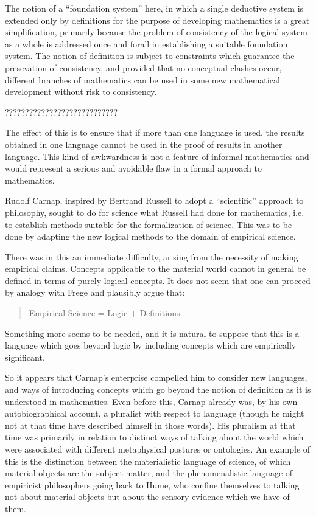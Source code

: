 The notion of a ``foundation system'' here, in which a single
deductive system is extended only by definitions for the purpose
of developing mathematics is a great simplification, primarily
because the problem of consistency of the logical system as a whole
is addressed once and forall in establishing a suitable foundation
system.
The notion of definition is subject to constraints which guarantee
the presevation of consistency, and provided that no conceptual
clashes occur, different branches of mathematics can be used in
some new mathematical development without risk to consistency.

????????????????????????????

The effect of this is to ensure that if more than one language is
used, the results obtained in one language cannot be used in the proof
of results in another language.
This kind of awkwardness is not a feature of informal mathematics and
would represent a serious and avoidable flaw in a formal approach to
mathematics.

Rudolf Carnap, inspired by Bertrand Russell to adopt a ``scientific''
approach to philosophy, sought to do for science what Russell had
done for mathematics, i.e. to establish methods suitable for the
formalization of science.
This was to be done by adapting the new logical methods to the domain
of empirical science.

There was in this an immediate difficulty, arising from the necessity
of making empirical claims.
Concepts applicable to the material world cannot in general be defined
in terms of purely logical concepts.
It does not seem that one can proceed by analogy with Frege and
plausibly argue that:

\begin{quote}
Empirical Science = Logic + Definitions
\end{quote}

Something more seems to be needed, and it is natural to suppose that
this is a language which goes beyond logic by including concepts which
are empirically significant.

So it appears that Carnap's enterprise compelled him to consider
new languages, and ways of introducing concepts which go beyond
the notion of definition as it is understood in mathematics.
Even before this, Carnap already was, by his own autobiographical
account, a pluralist with respect to language (though he might not at
that time have described himself in those words).
His pluralism at that time was primarily in relation to distinct ways
of talking about the world which were associated with different
metaphysical postures or ontologies.
An example of this is the distinction between the materialistic language of science,
of which material objects are the subject matter,
and the phenomenalistic language of empiricist philosophers going back to Hume,
who confine themselves to talking not about material objects but about the sensory evidence
which we have of them.

